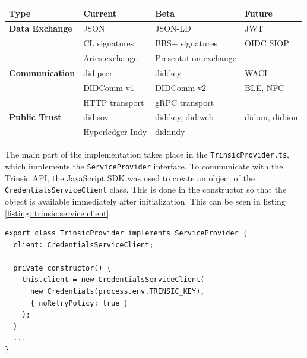        	\begin{center}
        		\begin{threeparttable}
            		\begin{tabular}{llll}
            			\hline 
            			Type & Current & Beta & Future\tabularnewline
            			\hline 
            			\textbf{Data Exchange} & JSON & JSON-LD   & JWT \tabularnewline
            			\textbf{}              & CL signatures    & BBS+ signatures       & OIDC SIOP\tabularnewline
            			\textbf{}              & Aries exchange   & Presentation exchange & \tabularnewline
            			\textbf{Communication} & did:peer         & did:key               & WACI\tabularnewline
            			\textbf{}              & DIDComm v1       & DIDComm v2            & BLE, NFC\tabularnewline
            			\textbf{}              & HTTP transport   & gRPC transport        & \tabularnewline
            			\textbf{Public Trust}  & did:sov          & did:key, did:web      & did:un, did:ion\tabularnewline
            			\textbf{}              & Hyperledger Indy & did:indy              & \tabularnewline
            			\hline 
            		\end{tabular}
        	\end{threeparttable}
        	\label{tab: trinsic roadmap}
    	\end{center}
    	
    The main part of the implementation takes place in the \texttt{TrinsicProvider.ts}, which implements the \texttt{ServiceProvider} interface. To communicate with the Trinsic API, the JavaScript SDK was used to create an object of the \texttt{CredentialsServiceClient} class. This is done in the constructor so that the object is available immediately after initialization. This can be seen in listing \ref{listing: trinsic service client}.
    \newline
    \begin{lstlisting}[style=ES6, caption=Connecting to Trinsic API via SDK, label={listing: trinsic service client}]
export class TrinsicProvider implements ServiceProvider {
  client: CredentialsServiceClient;

  private constructor() {
    this.client = new CredentialsServiceClient(
      new Credentials(process.env.TRINSIC_KEY), 
      { noRetryPolicy: true }
    );
  }
  ...
}\end{lstlisting}
    
